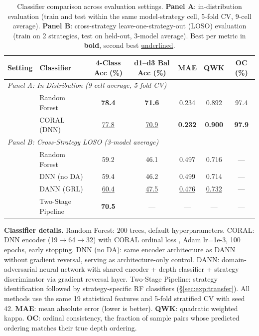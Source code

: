 
\begin{table}[t]
\centering
\caption{Classifier comparison across evaluation settings. \textbf{Panel A}: in-distribution evaluation (train and test within the same model-strategy cell, 5-fold CV, 9-cell average). \textbf{Panel B}: cross-strategy leave-one-strategy-out (LOSO) evaluation (train on 2 strategies, test on held-out, 3-model average). Best per metric in \textbf{bold}, second best \underline{underlined}.}
\label{tab:classifier_comparison}
\small
\begin{tabular}{@{}llccccc@{}}
\toprule
\textbf{Setting} & \textbf{Classifier} & \textbf{4-Class Acc (\%)} & \textbf{d1--d3 Bal Acc (\%)} & \textbf{MAE} & \textbf{QWK} & \textbf{OC (\%)} \\
\midrule
\multicolumn{7}{l}{\textit{Panel A: In-Distribution (9-cell average, 5-fold CV)}} \\
\midrule
& Random Forest & \textbf{78.4} & \textbf{71.6} & 0.234 & 0.892 & 97.4 \\
& CORAL (DNN) & \underline{77.8} & \underline{70.9} & \textbf{0.232} & \textbf{0.900} & \textbf{97.9} \\
\midrule
\multicolumn{7}{l}{\textit{Panel B: Cross-Strategy LOSO (3-model average)}} \\
\midrule
& Random Forest & 59.2 & 46.1 & 0.497 & 0.716 & --- \\
& DNN (no DA) & 59.4 & 46.2 & 0.499 & 0.714 & --- \\
& DANN (GRL) & \underline{60.4} & \underline{47.5} & \underline{0.476} & \underline{0.732} & --- \\
& Two-Stage Pipeline & \textbf{70.5} & --- & --- & --- & --- \\
\bottomrule
\end{tabular}

\vspace{0.5em}
\begin{minipage}{\textwidth}
\footnotesize
\textbf{Classifier details.}
Random Forest: 200 trees, default hyperparameters.
CORAL: DNN encoder (19$\to$64$\to$32) with CORAL ordinal loss \citep{cao2020coral}, Adam lr=1e-3, 100 epochs, early stopping.
DNN (no DA): same encoder architecture as DANN without gradient reversal, serving as architecture-only control.
DANN: domain-adversarial neural network \citep{ganin2016domain} with shared encoder + depth classifier + strategy discriminator via gradient reversal layer.
Two-Stage Pipeline: strategy identification followed by strategy-specific RF classifiers (\S\ref{sec:exp:transfer}).
All methods use the same 19 statistical features and 5-fold stratified CV with seed 42.
\textbf{MAE}: mean absolute error (lower is better).
\textbf{QWK}: quadratic weighted kappa.
\textbf{OC}: ordinal consistency, the fraction of sample pairs whose predicted ordering matches their true depth ordering.
\end{minipage}
\end{table}
